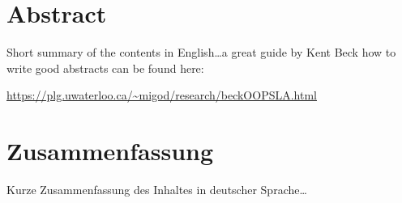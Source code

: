 \begingroup
\let\clearpage\relax
\let\cleardoublepage\relax
\let\cleardoublepage\relax

\chapter*{Abstract}
Short summary of the contents in English\dots a great guide by 
Kent Beck how to write good abstracts can be found here:  
\begin{center}
\url{https://plg.uwaterloo.ca/~migod/research/beckOOPSLA.html}
\end{center}

\vfill

\chapter*{Zusammenfassung}
Kurze Zusammenfassung des Inhaltes in deutscher Sprache\dots 

\endgroup			

\vfill